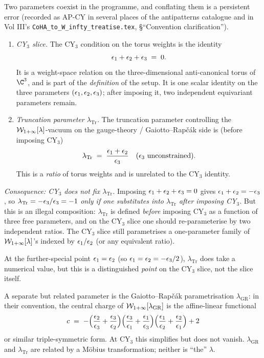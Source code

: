 \begin{remark}
\label{opus:rem:lambda-Tr-vs-CY3}
Two parameters coexist in the programme, and conflating them is a persistent error
(recorded as AP-CY in several places of the antipatterns catalogue and in
Vol III's \texttt{CoHA\_to\_W\_infty\_treatise.tex}, \S``Convention clarification'').
\begin{enumerate}
\item \emph{CY$_3$ slice.} The CY$_3$ condition on the torus weights is the identity
\[
 \epsilon_1 + \epsilon_2 + \epsilon_3 \;=\; 0.
\]
It is a weight-space relation on the three-dimensional anti-canonical torus of $\C^3$,
and is part of the \emph{definition} of the setup. It is one scalar identity on the
three parameters $(\epsilon_1, \epsilon_2, \epsilon_3)$; after imposing it, two independent
equivariant parameters remain.
\item \emph{Truncation parameter $\lambda_{\mathrm{Tr}}$.} The truncation parameter
controlling the $\mathcal{W}_{1+\infty}[\lambda]$-vacuum on the gauge-theory / Gaiotto--Rap\v c\'ak
side is (before imposing CY$_3$)
\[
 \lambda_{\mathrm{Tr}} \;=\; \frac{\epsilon_1 + \epsilon_2}{\epsilon_3}
 \quad (\epsilon_3\text{ unconstrained}).
\]
This is a \emph{ratio} of torus weights and is unrelated to the CY$_3$ identity.
\end{enumerate}

\emph{Consequence: CY$_3$ does not fix $\lambda_{\mathrm{Tr}}$.} Imposing
$\epsilon_1 + \epsilon_2 + \epsilon_3 = 0$ gives $\epsilon_1 + \epsilon_2 = -\epsilon_3$, so
$\lambda_{\mathrm{Tr}} = -\epsilon_3/\epsilon_3 = -1$ \emph{only if one substitutes into
$\lambda_{\mathrm{Tr}}$ after imposing CY$_3$}. But this is an illegal composition:
$\lambda_{\mathrm{Tr}}$ is defined \emph{before} imposing CY$_3$ as a function of
three free parameters, and on the CY$_3$ slice one should re-parameterise by two
independent ratios. The CY$_3$ slice still parametrises a one-parameter family of
$\mathcal{W}_{1+\infty}[\lambda]$'s indexed by $\epsilon_1/\epsilon_2$ (or any equivalent ratio).

At the further-special point $\epsilon_1 = \epsilon_2$ (so $\epsilon_1 = \epsilon_2 = -\epsilon_3/2$),
$\lambda_{\mathrm{Tr}}$ does take a numerical value, but this is a distinguished
\emph{point} on the CY$_3$ slice, not the slice itself.
\end{remark}

\begin{remark}
\label{opus:rem:GR-parametrisation}
A separate but related parameter is the Gaiotto--Rap\v c\'ak parametrisation
$\lambda_{\mathrm{GR}}$: in their convention, the central charge of $\mathcal{W}_{1+\infty}[\lambda_{\mathrm{GR}}]$
is the affine-linear functional
\[
 c \;=\; -\Big(\frac{\epsilon_2}{\epsilon_3} + \frac{\epsilon_3}{\epsilon_2}\Big)\Big(\frac{\epsilon_3}{\epsilon_1} + \frac{\epsilon_1}{\epsilon_3}\Big)\Big(\frac{\epsilon_1}{\epsilon_2} + \frac{\epsilon_2}{\epsilon_1}\Big) + 2
\]
or similar triple-symmetric form. At CY$_3$ this simplifies but does not vanish.
$\lambda_{\mathrm{GR}}$ and $\lambda_{\mathrm{Tr}}$ are related by a Möbius
transformation; neither is ``the'' $\lambda$.
\end{remark}

